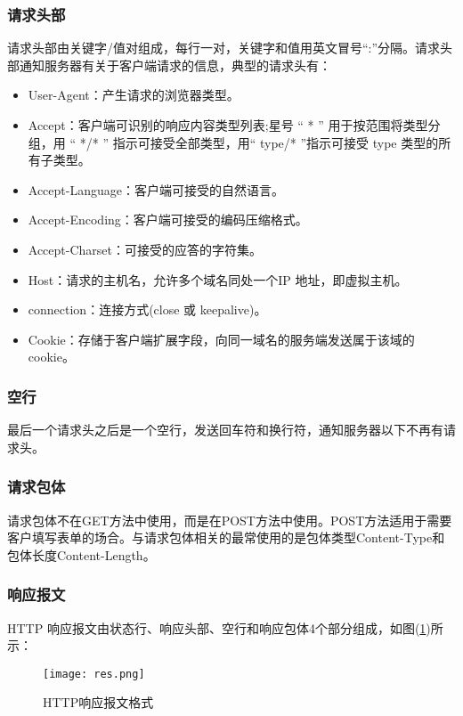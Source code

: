 \documentclass[bachelor]{thesis-uestc}
\begin{document}
\subsubsection*{请求头部}

请求头部由关键字/值对组成，每行一对，关键字和值用英文冒号“:”分隔。请求头部通知服务器有关于客户端请求的信息，典型的请求头有：
\begin{itemize}
	\item User-Agent：产生请求的浏览器类型。
	\item Accept：客户端可识别的响应内容类型列表;星号 “ * ” 用于按范围将类型分组，用 “ */* ” 指示可接受全部类型，用“ type/* ”指示可接受 type 类型的所有子类型。
	\item Accept-Language：客户端可接受的自然语言。
	\item Accept-Encoding：客户端可接受的编码压缩格式。
	\item Accept-Charset：可接受的应答的字符集。
	\item Host：请求的主机名，允许多个域名同处一个IP 地址，即虚拟主机。
	\item connection：连接方式(close 或 keepalive)。
	\item Cookie：存储于客户端扩展字段，向同一域名的服务端发送属于该域的cookie。
\end{itemize}

\subsubsection*{空行}


最后一个请求头之后是一个空行，发送回车符和换行符，通知服务器以下不再有请求头。

\subsubsection*{请求包体}

请求包体不在GET方法中使用，而是在POST方法中使用。POST方法适用于需要客户填写表单的场合。与请求包体相关的最常使用的是包体类型Content-Type和包体长度Content-Length。

\subsubsection{响应报文}

HTTP 响应报文由状态行、响应头部、空行和响应包体4个部分组成，如图(\ref{httpres})所示：
\begin{figure}[h]
\texttt{[image: res.png]}	
\caption{HTTP响应报文格式}
\label{httpres} 
\end{figure}
\end{document}
